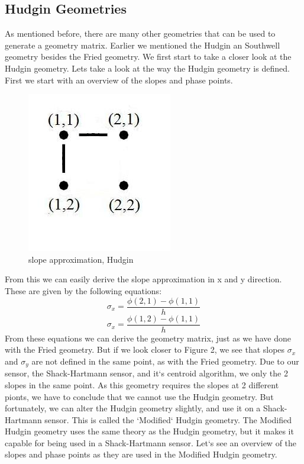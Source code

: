 \documentclass{article}
\begin{document}
\subsection{Hudgin Geometries}
As mentioned before, there are many other geometries that can be used to generate a geometry matrix. Earlier we mentioned the Hudgin an Southwell geometry besides the Fried geometry. We first start to take a closer look at the Hudgin geometry.
\newline
\newline
Lets take a look at the way the Hudgin geometry is defined. First we start with an overview of the slopes and phase points.
\begin{figure}[h!]
  \centering
  \includegraphics[scale=0.6]{figures/Hudgin}
  \caption{slope approximation, Hudgin}
\end{figure}
From this we can easily derive the slope approximation in x and y direction. These are given by the following equations:
$$ \sigma_x = \frac{\phi(2,1)-\phi(1,1)}{h}$$
$$ \sigma_x = \frac{\phi(1,2)-\phi(1,1)}{h}$$
From these equations we can derive the geometry matrix, just as we have done with the Fried geometry. But if we look closer to Figure 2, we see that slopes $\sigma_x$ and $\sigma_y$ are not defined in the same point, as with the Fried geometry. Due to our sensor, the Shack-Hartmann sensor, and it`s centroid algorithm, we only the 2 slopes in the same point. As this geometry requires the slopes at 2 different pionts, we have to conclude that we cannot use the Hudgin geometry. But fortunately, we can alter the Hudgin geometry slightly, and use it on a Shack-Hartmann sensor. This is called the `Modified` Hudgin geometry\cite{rosensteiner2011cumulative}.
\newline
\newline
The Modified Hudgin geometry uses the same theory as the Hudgin geometry, but it makes it capable for being used in a Shack-Hartmann sensor. Let`s see an overview of the slopes and phase points as they are used in the Modified Hudgin geometry.  
\end{document}
